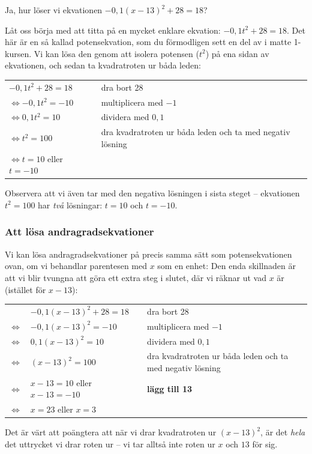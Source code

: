 Ja, hur löser vi ekvationen $-0,1(x-13)^2+28=18$?

Låt oss börja med att titta på en mycket enklare ekvation: $-0,1t^2+28=18$.
Det här är en så kallad potensekvation, som du förmodligen sett en del av i matte 1-kursen.
Vi kan lösa den genom att isolera potensen ($t^2$) på ena sidan av ekvationen, och sedan ta kvadratroten ur båda leden:

\begin{tabular}{l|p{4.7cm}}
  $-0,1t^2+28=18$ & dra bort 28 \\
  $\Leftrightarrow -0,1t^2=-10$ & multiplicera med $-1$ \\
  $\Leftrightarrow 0,1t^2=10$ & dividera med $0,1$ \\
  $\Leftrightarrow t^2=100$ & dra kvadratroten ur båda leden och ta med negativ lösning \\
  $\Leftrightarrow t=10$ eller $t=-10$
\end{tabular}

Observera att vi även tar med den negativa lösningen i sista steget -- ekvationen $t^2=100$ har \emph{två} lösningar: $t=10$ och $t=-10$.

\subsubsection{Att lösa andragradsekvationer}

Vi kan lösa andragradsekvationer på precis samma sätt som potensekvationen ovan, om vi behandlar parentesen med $x$ som en enhet:
Den enda skillnaden är att vi blir tvungna att göra ett extra steg i slutet, där vi räknar ut vad $x$ är (istället för $x-13$):

\begin{tabular}{r p{5cm}|p{4.7cm}}
  & $-0,1(x-13)^2+28=18$ & dra bort 28 \\
  $\Leftrightarrow$ & $-0,1(x-13)^2=-10$ & multiplicera med $-1$ \\
  $\Leftrightarrow$ & $0,1(x-13)^2=10$ & dividera med $0,1$ \\
  $\Leftrightarrow$ & $(x-13)^2=100$ & dra kvadratroten ur båda leden och ta med negativ lösning \\
  $\Leftrightarrow$ & $x-13=10$ eller $x-13=-10$ & \textbf{lägg till 13} \\
  $\Leftrightarrow$ & $x = 23$ eller $x=3$  
\end{tabular}

Det är värt att poängtera att när vi drar kvadratroten ur $(x-13)^2$, är det \emph{hela} det uttrycket vi drar roten ur -- vi tar alltså inte roten ur $x$ och $13$ för sig.

